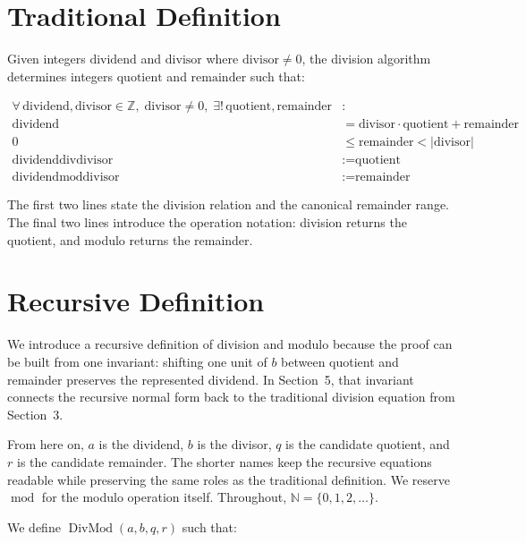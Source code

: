 \section{Traditional Definition}
\label{sec:traditional-definition}

Given integers $\text{dividend}$ and $\text{divisor}$ where
$\text{divisor} \neq 0$, the division algorithm determines integers
$\text{quotient}$ and $\text{remainder}$ such that:

\begin{equation*}
\begin{aligned}
\forall\, \text{dividend},\text{divisor} \in \mathbb{Z},\;
\text{divisor} \neq 0,\;
\exists!\, \text{quotient},\text{remainder} &: \\
\text{dividend} &= \text{divisor} \cdot \text{quotient} + \text{remainder} \\
0 &\leq \text{remainder} < \lvert\text{divisor}\rvert \\
\text{dividend} \operatorname{div} \text{divisor} &:= \text{quotient} \\
\text{dividend} \operatorname{mod} \text{divisor} &:= \text{remainder}
\end{aligned}
\end{equation*}

The first two lines state the division relation and the canonical remainder
range. The final two lines introduce the operation notation: division returns
the quotient, and modulo returns the remainder.

\section{Recursive Definition}
\label{sec:recursive-definition}

We introduce a recursive definition of division and modulo because the proof
can be built from one invariant: shifting one unit of $b$ between quotient and
remainder preserves the represented dividend. In Section~5, that invariant
connects the recursive normal form back to the traditional division equation
from Section~3.

From here on, $a$ is the dividend, $b$ is the divisor, $q$ is the candidate
quotient, and $r$ is the candidate remainder. The shorter names keep the
recursive equations readable while preserving the same roles as the
traditional definition. We reserve $\operatorname{mod}$ for the modulo
operation itself. Throughout, $\mathbb{N}=\{0,1,2,\ldots\}$.

We define $\operatorname{DivMod}(a,b,q,r)$ such that:

